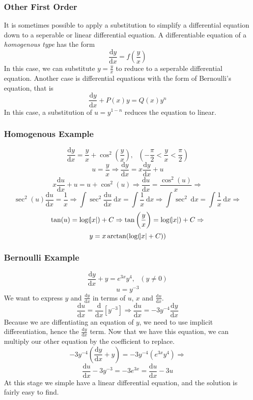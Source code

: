 \documentclass[12pt]{report}
\newcommand{\dx}{\:\mathrm{d}x}
\newcommand{\dd}[2]{\frac{\mathrm{d}#1}{\mathrm{d}#2}}
\newcommand{\mcom}{, \:\:\:}
\newcommand{\derivx}[1]{\frac{\mathrm{d}}{\mathrm{d}x}\left[#1\right]}
\begin{document}
\begin{flushleft}
\subsubsection*{Other First Order}

It is sometimes possible to apply a substitution to simplify a differential
equation down to a seperable or linear differential equation. A differentiable
equation of a \textit{homogenous type} has the form
\[\dd{y}{x} = f\left(\frac{y}{x}\right)\]
In this case, we can substitute \(y = \frac{y}{x}\) to reduce to a seperable
differential equation. Another case is differential equations with the form
of Bernoulli's equation, that is
\[\dd{y}{x} + P(x)y = Q(x)y^n\]
In this case, a substitution of \(u = y^{1 - n}\) reduces the equation to 
linear.

\subsubsection*{Homogenous Example}

\[\dd{y}{x} = \frac{y}{x} + \cos^2\left(\frac{y}{x}\right)
\mcom (-\frac{\pi}{2} < \frac{y}{x} < \frac{\pi}{2})\]
\[u = \frac{y}{x} \Rightarrow \dd{y}{x} = x\dd{y}{x} + u\]
\[x\dd{u}{x} + u = u + \cos^2(u) \Rightarrow \dd{u}{x} = \frac{\cos^2(u)}{x}
\Rightarrow\]
\[\sec^2(u)\dd{u}{x} = \frac{1}{x} \Rightarrow \int\sec^2\dd{u}{x}\dx 
= \int\frac{1}{x}\dx \Rightarrow \int\sec^2\dx = \int\frac{1}{x}\dx
\Rightarrow\]
\[\tan(u) = \log(\abs{x}) + C \Rightarrow \tan\left(\frac{y}{x}\right) 
= \log(\abs{x}) + C \Rightarrow\]
\[y = x\arctan(\log(\abs{x} + C))\]

\subsubsection*{Bernoulli Example}

\begin{center}
    \[\dd{y}{x} + y = e^{3x}y^4\mcom (y\neq0)\]
    \[u = y^{-3}\]
    We want to express \(y\) and \(\dd{y}{x}\) in terms of \(u\), \(x\) and 
    \(\dd{u}{x}\).
    \[\dd{u}{x} = \derivx{y^{-3}} \Rightarrow \dd{u}{x} = -3y^{-4}\dd{y}{x}\]
    Because we are diffentiating an equation of \(y\), we need to use implicit
    differentiation, hence the \(\dd{y}{x}\) term. Now that we have this
    equation, we can multiply our other equation by the coefficient to replace.
    \[-3y^{-4}\left(\dd{y}{x} + y\right) = -3y^{-4}\left(e^{3x}y^4\right)
    \Rightarrow\]
    \[\dd{u}{x} - 3y^{-3} = -3e^{3x} = \dd{u}{x} -3u\]
    At this stage we simple have a linear differential equation, and the
    solution is fairly easy to find.
\end{center}

\end{flushleft}
\end{document}
